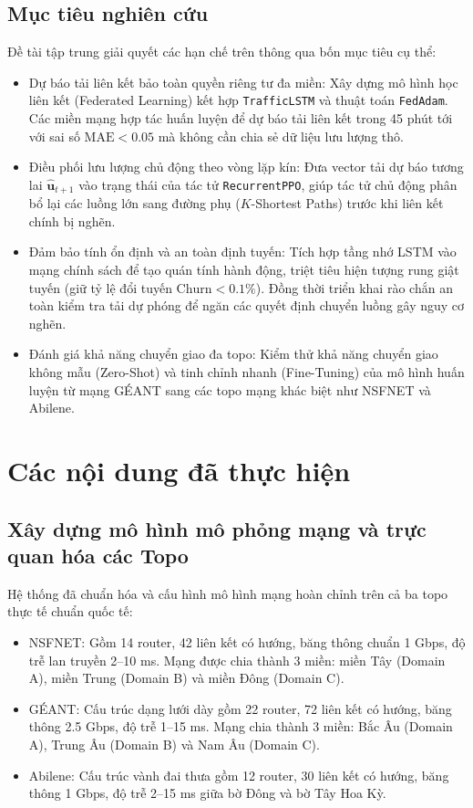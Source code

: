 \documentclass[11pt,a4paper]{article}
\begin{document}
\subsection{Mục tiêu nghiên cứu}
Đề tài tập trung giải quyết các hạn chế trên thông qua bốn mục tiêu cụ thể:
\begin{itemize}[leftmargin=1.5em, itemsep=0.3ex]
    \item Dự báo tải liên kết bảo toàn quyền riêng tư đa miền: Xây dựng mô hình học liên kết (Federated Learning) kết hợp \texttt{TrafficLSTM} và thuật toán \texttt{FedAdam}. Các miền mạng hợp tác huấn luyện để dự báo tải liên kết trong 45 phút tới với sai số $\text{MAE} < 0.05$ mà không cần chia sẻ dữ liệu lưu lượng thô.
    \item Điều phối lưu lượng chủ động theo vòng lặp kín: Đưa vector tải dự báo tương lai $\mathbf{\hat{u}}_{t+1}$ vào trạng thái của tác tử \texttt{RecurrentPPO}, giúp tác tử chủ động phân bổ lại các luồng lớn sang đường phụ ($K$-Shortest Paths) trước khi liên kết chính bị nghẽn.
    \item Đảm bảo tính ổn định và an toàn định tuyến: Tích hợp tầng nhớ LSTM vào mạng chính sách để tạo quán tính hành động, triệt tiêu hiện tượng rung giật tuyến (giữ tỷ lệ đổi tuyến $\text{Churn} < 0.1\%$). Đồng thời triển khai rào chắn an toàn kiểm tra tải dự phóng để ngăn các quyết định chuyển luồng gây nguy cơ nghẽn.
    \item Đánh giá khả năng chuyển giao đa topo: Kiểm thử khả năng chuyển giao không mẫu (Zero-Shot) và tinh chỉnh nhanh (Fine-Tuning) của mô hình huấn luyện từ mạng GÉANT sang các topo mạng khác biệt như NSFNET và Abilene.
\end{itemize}

\section{Các nội dung đã thực hiện}

\subsection{Xây dựng mô hình mô phỏng mạng và trực quan hóa các Topo}
Hệ thống đã chuẩn hóa và cấu hình mô hình mạng hoàn chỉnh trên cả ba topo thực tế chuẩn quốc tế:
\begin{itemize}[leftmargin=1.5em, itemsep=0.2ex]
    \item NSFNET: Gồm 14 router, 42 liên kết có hướng, băng thông chuẩn 1 Gbps, độ trễ lan truyền 2--10 ms. Mạng được chia thành 3 miền: miền Tây (Domain A), miền Trung (Domain B) và miền Đông (Domain C).
    \item GÉANT: Cấu trúc dạng lưới dày gồm 22 router, 72 liên kết có hướng, băng thông 2.5 Gbps, độ trễ 1--15 ms. Mạng chia thành 3 miền: Bắc Âu (Domain A), Trung Âu (Domain B) và Nam Âu (Domain C).
    \item Abilene: Cấu trúc vành đai thưa gồm 12 router, 30 liên kết có hướng, băng thông 1 Gbps, độ trễ 2--15 ms giữa bờ Đông và bờ Tây Hoa Kỳ.
\end{itemize}
\end{document}
